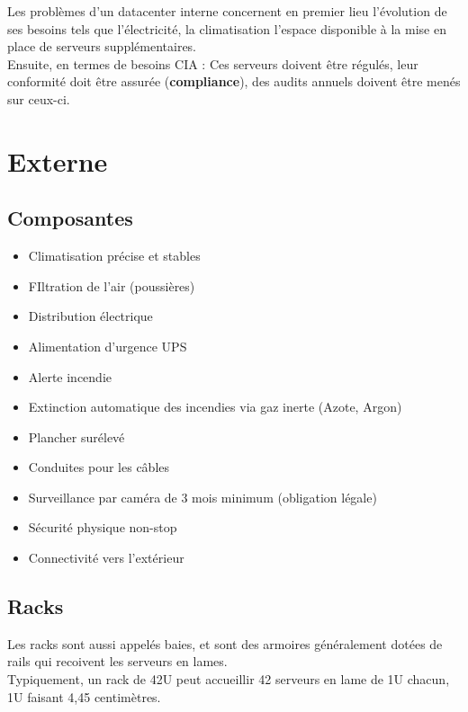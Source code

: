 \documentclass{report}
\begin{document}
			Les problèmes d'un datacenter interne concernent en premier lieu l'évolution de ses besoins tels que l'électricité, la climatisation l'espace disponible à la mise en place de serveurs supplémentaires.\\

			Ensuite, en termes de besoins CIA : Ces serveurs doivent être régulés, leur conformité doit être assurée (\textbf{compliance}), des audits annuels doivent être menés sur ceux-ci.\\

	\section{Externe}

		\subsection{Composantes}

			\begin{itemize}
				\item Climatisation précise et stables
				\item FIltration de l'air (poussières)
				\item Distribution électrique
				\item Alimentation d'urgence UPS
				\item Alerte incendie
				\item Extinction automatique des incendies via gaz inerte (Azote, Argon)
				\item Plancher surélevé
				\item Conduites pour les câbles
				\item Surveillance par caméra de 3 mois minimum (obligation légale)
				\item Sécurité physique non-stop
				\item Connectivité vers l'extérieur
			\end{itemize}

		\subsection{Racks}

			Les racks sont aussi appelés baies, et sont des armoires généralement dotées de rails qui recoivent les serveurs en lames.\\

			Typiquement, un rack de 42U peut accueillir 42 serveurs en lame de 1U chacun, 1U faisant 4,45 centimètres.\\
\end{document}
